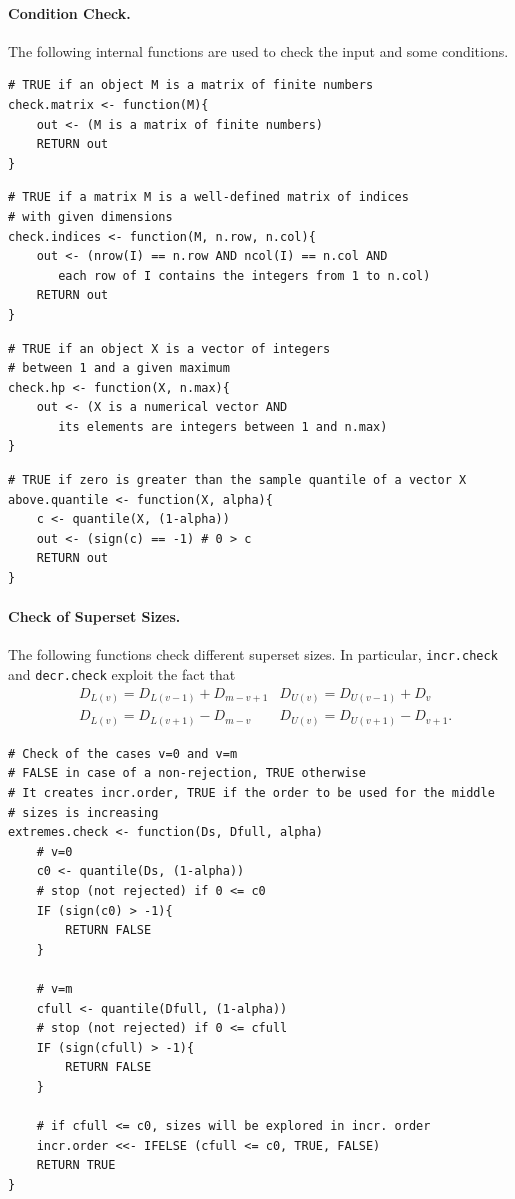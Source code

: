 \documentclass[11pt,a4paper,openright,twoside]{article}
\begin{document}
\vspace{3mm}
\paragraph{Condition Check.} The following internal functions are used to check the input and some conditions.

\begin{lstlisting}
# TRUE if an object M is a matrix of finite numbers
check.matrix <- function(M){
	out <- (M is a matrix of finite numbers)
	RETURN out
}
\end{lstlisting}

\begin{lstlisting}
# TRUE if a matrix M is a well-defined matrix of indices
# with given dimensions
check.indices <- function(M, n.row, n.col){
	out <- (nrow(I) == n.row AND ncol(I) == n.col AND
	   each row of I contains the integers from 1 to n.col)
	RETURN out
}
\end{lstlisting}

\begin{lstlisting}
# TRUE if an object X is a vector of integers
# between 1 and a given maximum
check.hp <- function(X, n.max){
	out <- (X is a numerical vector AND
	   its elements are integers between 1 and n.max)
}
\end{lstlisting}

\begin{lstlisting}
# TRUE if zero is greater than the sample quantile of a vector X
above.quantile <- function(X, alpha){
	c <- quantile(X, (1-alpha))
	out <- (sign(c) == -1) # 0 > c
	RETURN out
}
\end{lstlisting}




\vspace{3mm}
\paragraph{Check of Superset Sizes.} The following functions check different superset sizes. In particular, \texttt{incr.check} and \texttt{decr.check} exploit the fact that
\begin{align*}
&D_{L(v)}=D_{L(v-1)}+D_{m-v+1} & D_{U(v)}=D_{U(v-1)}+D_{v}\\
&D_{L(v)}=D_{L(v+1)}-D_{m-v} & D_{U(v)}=D_{U(v+1)}-D_{v+1}.
\end{align*}

\begin{lstlisting}
# Check of the cases v=0 and v=m
# FALSE in case of a non-rejection, TRUE otherwise
# It creates incr.order, TRUE if the order to be used for the middle
# sizes is increasing
extremes.check <- function(Ds, Dfull, alpha)
	# v=0
	c0 <- quantile(Ds, (1-alpha))
	# stop (not rejected) if 0 <= c0
	IF (sign(c0) > -1){
		RETURN FALSE
	}

	# v=m
	cfull <- quantile(Dfull, (1-alpha))
	# stop (not rejected) if 0 <= cfull
	IF (sign(cfull) > -1){
		RETURN FALSE
	}

	# if cfull <= c0, sizes will be explored in incr. order
	incr.order <<- IFELSE (cfull <= c0, TRUE, FALSE)
	RETURN TRUE
}\end{lstlisting}
\end{document}
